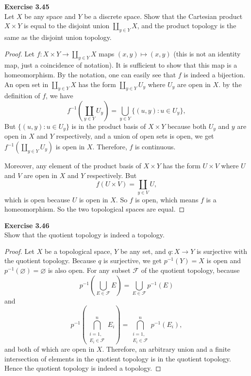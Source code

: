 \documentclass[12pt, a4paper]{article}
\theoremstyle{plain}
\newcommand{\F}{\mathcal{F}}
\newenvironment{exercise}[2][Exercise]
    { \begin{mdframed}[backgroundcolor=gray!20] \textbf{#1 #2} \\}
    {  \end{mdframed}}
\begin{document}
\begin{exercise}{3.45}
Let $X$ be any space and $Y$ be a discrete space. Show that the Cartesian product $X\times Y$ is equal to the disjoint union $\coprod_{y\in Y}X$, and the product topology is the same as the disjoint union topology.
\end{exercise}
	\begin{proof}
	Let $f:X\times Y\rightarrow \coprod_{y\in Y}X$ maps $(x,y)\mapsto (x,y)$ (this is not an identity map, just a coincidence of notation). It is sufficient to show that this map is a homeomorphism. By the notation, one can easily see that $f$ is indeed a bijection. An open set in $\coprod_{y\in Y}X$ has the form $\coprod_{y\in Y}U_y$ where $U_y$ are open in $X$. by the definition of $f$, we have
	\[
	f^{-1}(\coprod_{y\in Y}U_y)=\bigcup_{y\in Y}\{(u,y):u\in U_y\},
	\]	
	But $\{(u,y):u\in U_y\}$ is in the product basis of $X\times Y$ because both $U_y$ and $y$ are open in $X$ and $Y$ respectively, and a union of open sets is open, we get $f^{-1}(\coprod_{y\in Y}U_y)$ is open in $X$. Therefore, $f$ is continuous.
	
	Moreover, any element of the product basis of $X\times Y$ has the form $U\times V$ where $U$ and $V$ are open in $X$ and $Y$ respectively. But
	\[
	f(U\times V) = \coprod_{y\in V}U,
	\]
	which is open because $U$ is open in $X$. So $f$ is open, which means $f$ is a homeomorphism. So the two topological spaces are equal.
	\end{proof}
	
\begin{exercise}{3.46}
Show that the quotient topology is indeed a topology.
\end{exercise}
	\begin{proof}
	Let $X$ be a topological space, $Y$ be any set, and $q:X\rightarrow Y$ is surjective with the quotient topology. Because $q$ is surjective, we get $p^{-1}(Y)=X$ is open and $p^{-1}(\varnothing)=\varnothing$ is also open. For any subset $\F$ of the quotient topology, because
	\[
	p^{-1}\left(\bigcup_{E\in\F}E\right)=\bigcup_{E\in\F}p^{-1}(E)
	\]
	and
	\[
	p^{-1}\left(\bigcap_{\substack{{i=1,}\\ E_i\in\F}}^nE_i\right) = \bigcap_{\substack{{i=1,}\\ E_i\in\F}}^np^{-1}(E_i),
	\]
	and both of which are open in $X$. Therefore, an arbitrary union and a finite intersection of elements in the quotient topology is in the quotient topology. Hence the quotient topology is indeed a topology.
	\end{proof}
	
\end{document}
